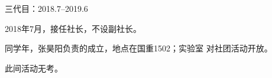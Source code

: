\begin{section}{三代目：2018.7--2019.6}
	\label{history:三代目}

	2018年7月，接任社长，不设副社长。

	同学年，张昊阳负责的成立，地点在国重1502；实验室
	对社团活动开放。

	此间活动无考。
\end{section}
